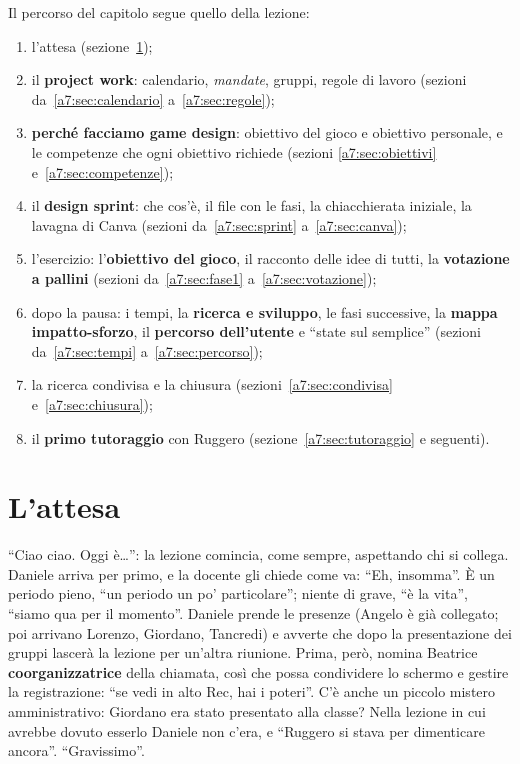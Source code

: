 Il percorso del capitolo segue quello della lezione:
\begin{enumerate}
  \item l'attesa (sezione~\ref{a7:sec:attesa});
  \item il \textbf{project work}: calendario, \emph{mandate}, gruppi, regole di
        lavoro (sezioni da~\ref{a7:sec:calendario} a~\ref{a7:sec:regole});
  \item \textbf{perché facciamo game design}: obiettivo del gioco e obiettivo
        personale, e le competenze che ogni obiettivo richiede (sezioni
        \ref{a7:sec:obiettivi} e~\ref{a7:sec:competenze});
  \item il \textbf{design sprint}: che cos'è, il file con le fasi, la
        chiacchierata iniziale, la lavagna di Canva (sezioni
        da~\ref{a7:sec:sprint} a~\ref{a7:sec:canva});
  \item l'esercizio: l'\textbf{obiettivo del gioco}, il racconto delle idee di
        tutti, la \textbf{votazione a pallini} (sezioni da~\ref{a7:sec:fase1}
        a~\ref{a7:sec:votazione});
  \item dopo la pausa: i tempi, la \textbf{ricerca e sviluppo}, le fasi
        successive, la \textbf{mappa impatto-sforzo}, il \textbf{percorso
        dell'utente} e ``state sul semplice'' (sezioni da~\ref{a7:sec:tempi}
        a~\ref{a7:sec:percorso});
  \item la ricerca condivisa e la chiusura (sezioni~\ref{a7:sec:condivisa}
        e~\ref{a7:sec:chiusura});
  \item il \textbf{primo tutoraggio} con Ruggero (sezione~\ref{a7:sec:tutoraggio}
        e seguenti).
\end{enumerate}

\section{L'attesa}
\label{a7:sec:attesa}

``Ciao ciao. Oggi è\ldots'': la lezione comincia, come sempre, aspettando chi si
collega. Daniele arriva per primo, e la docente gli chiede come va: ``Eh,
insomma''. È un periodo pieno, ``un periodo un po' particolare''; niente di grave,
``è la vita'', ``siamo qua per il momento''. Daniele prende le presenze (Angelo è
già collegato; poi arrivano Lorenzo, Giordano, Tancredi) e avverte che dopo la
presentazione dei gruppi lascerà la lezione per un'altra riunione. Prima, però,
nomina Beatrice \textbf{coorganizzatrice} della chiamata, così che possa condividere
lo schermo e gestire la registrazione: ``se vedi in alto Rec, hai i poteri''. C'è
anche un piccolo mistero amministrativo: Giordano era stato presentato alla classe?
Nella lezione in cui avrebbe dovuto esserlo Daniele non c'era, e ``Ruggero si stava
per dimenticare ancora''. ``Gravissimo''.

